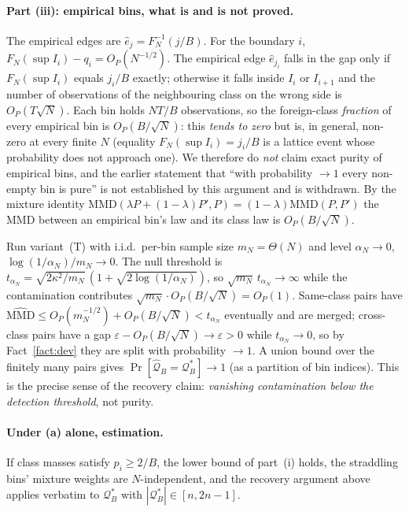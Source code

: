 \documentclass[10pt]{article}
\newcommand{\calQ}{\mathcal{Q}}
\newcommand{\Qstar}{\mathcal{Q}^*}
\newcommand{\mmd}{\mathrm{MMD}}
\begin{document}
\paragraph{Part (iii): empirical bins, what is and is not proved.}
The empirical edges are $\hat e_j=F_N^{-1}(j/B)$.  For the boundary $i$,
$F_N(\sup I_i)-q_i=O_P(N^{-1/2})$.  The empirical edge $\hat e_{j_i}$ falls in the
gap only if $F_N(\sup I_i)$ equals $j_i/B$ exactly; otherwise it falls inside
$I_i$ or $I_{i+1}$ and the number of observations of the neighbouring class
on the wrong side is $O_P(T\sqrt N)$.  Each bin holds $NT/B$ observations, so the
foreign-class \emph{fraction} of every empirical bin is $O_P(B/\sqrt N)$: this
\emph{tends to zero} but is, in general, non-zero at every finite $N$
(equality $F_N(\sup I_i)=j_i/B$ is a lattice event whose probability does not
approach one).  We therefore do \emph{not} claim exact purity of empirical bins,
and the earlier statement that ``with probability $\to1$ every non-empty bin is
pure'' is not established by this argument and is withdrawn.  By the mixture
identity $\mmd(\lambda P+(1-\lambda)P',P)=(1-\lambda)\mmd(P,P')$ the MMD between
an empirical bin's law and its class law is $O_P(B/\sqrt N)$.

Run variant~(T) with i.i.d.\ per-bin sample size $m_N=\Theta(N)$ and level
$\alpha_N\to0$, $\log(1/\alpha_N)/m_N\to0$.  The null threshold is
$t_{\alpha_N}=\sqrt{2\kappa^2/m_N}\,(1+\sqrt{2\log(1/\alpha_N)})$, so
$\sqrt{m_N}\,t_{\alpha_N}\to\infty$ while the contamination contributes
$\sqrt{m_N}\cdot O_P(B/\sqrt N)=O_P(1)$.  Same-class pairs have
$\widehat{\mmd}\le O_P(m_N^{-1/2})+O_P(B/\sqrt N)<t_{\alpha_N}$ eventually and are
merged; cross-class pairs have a gap $\varepsilon-O_P(B/\sqrt N)\to\varepsilon>0$
while $t_{\alpha_N}\to0$, so by Fact~\ref{fact:dev} they are split with
probability $\to1$.  A union bound over the finitely many pairs gives
$\Pr[\widehat{\calQ}_B=\Qstar_B]\to1$ (as a partition of bin indices).  This is the
precise sense of the recovery claim: \emph{vanishing contamination below the
detection threshold}, not purity.

\paragraph{Under (a) alone, estimation.}
If class masses satisfy $p_i\ge2/B$, the lower bound of part~(i) holds, the
straddling bins' mixture weights are $N$-independent, and the recovery argument
above applies verbatim to $\Qstar_B$ with $|\Qstar_B|\in[n,2n-1]$.
\end{document}
